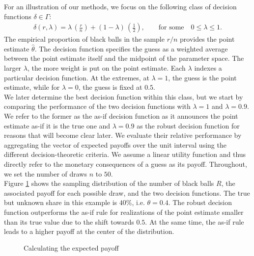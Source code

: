 For an illustration of our methods, we focus on the following class of decision functions $\delta \in \Gamma$:
%
\begin{align*}
 \delta(r, \lambda) = \lambda\,\left(\frac{r}{n}\right)  + (1 - \lambda)\,\left(\frac{1}{2}\right),\qquad\text{for some}\quad 0 \leq \lambda \leq 1.
\end{align*}
%
The empirical proportion of black balls in the sample $r / n$ provides the point estimate $\hat{\theta}$. The decision function specifies the guess as a weighted average between the point estimate itself and the midpoint of the parameter space. The larger $\lambda$, the more weight is put on the point estimate. Each $\lambda$ indexes a particular decision function. At the extremes, at $\lambda = 1$, the guess is the point estimate, while for $\lambda = 0$, the guess is fixed at $0.5$.\\

We later determine the best decision function within this class, but we start by comparing the performance of the two decision functions with $\lambda = 1$ and $\lambda = 0.9$. We refer to the former as the as-if decision function as it announces the point estimate as-if it is the true one and $\lambda=0.9$ as the robust decision function for reasons that will become clear later. We evaluate their relative performance by aggregating the vector of expected payoffs over the unit interval using the different decision-theoretic criteria. We assume a linear utility function and thus directly refer to the monetary consequences of a guess as its payoff. Throughout, we set the number of draws $n$ to  $50$.\\

Figure \ref{Calculation of expected payoff} shows the sampling distribution of the number of black balls $R$, the associated payoff for each possible draw, and the two decision functions. The true but unknown share in this example is $40\%$, i.e. $\theta = 0.4$. The robust decision function outperforms the as-if rule for realizations of the point estimate smaller than its true value due to the shift towards $0.5$. At the same time, the as-if rule leads to a higher payoff at the center of the distribution.\\

\begin{figure}[h!]\centering
{}
\caption{Calculating the expected payoff}\label{Calculation of expected payoff}
\end{figure}\FloatBarrier


